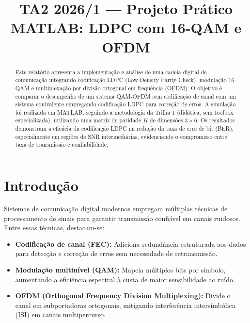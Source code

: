 \documentclass[conference]{IEEEtran}
\begin{document}
\title{TA2 2026/1 --- Projeto Prático MATLAB: LDPC com 16-QAM e OFDM}

\author{
}

\maketitle

\begin{abstract}
Este relatório apresenta a implementação e análise de uma cadeia digital de comunicação integrando codificação LDPC (Low-Density Parity-Check), modulação 16-QAM e multiplexação por divisão ortogonal em frequência (OFDM). O objetivo é comparar o desempenho de um sistema QAM-OFDM sem codificação de canal com um sistema equivalente empregando codificação LDPC para correção de erros. A simulação foi realizada em MATLAB, seguindo a metodologia da Trilha 1 (didática, sem toolbox especializada), utilizando uma matriz de paridade $H$ de dimensões $3 \times 6$. Os resultados demonstram a eficácia da codificação LDPC na redução da taxa de erro de bit (BER), especialmente em regiões de SNR intermediárias, evidenciando o compromisso entre taxa de transmissão e confiabilidade.
\end{abstract}

\section{Introdução}

Sistemas de comunicação digital modernos empregam múltiplas técnicas de processamento de sinais para garantir transmissão confiável em canais ruidosos. Entre essas técnicas, destacam-se:

\begin{itemize}
    \item \textbf{Codificação de canal (FEC):} Adiciona redundância estruturada aos dados para detecção e correção de erros sem necessidade de retransmissão.
    \item \textbf{Modulação multinível (QAM):} Mapeia múltiplos bits por símbolo, aumentando a eficiência espectral à custa de maior sensibilidade ao ruído.
    \item \textbf{OFDM (Orthogonal Frequency Division Multiplexing):} Divide o canal em subportadoras ortogonais, mitigando interferência intersimbólica (ISI) em canais multipercurso.
\end{itemize}
\end{document}
